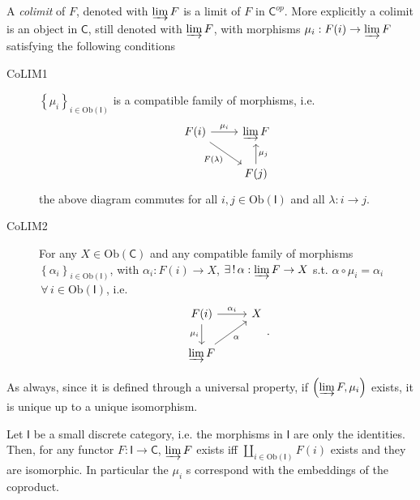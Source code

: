 \begin{defn}
	A {\em colimit} of $F$, denoted with $\varinjlim F$ is a limit of $F$ in $\mathsf{C}^{op}$.
	More explicitly a colimit is an object in $\mathsf{C}$, still denoted with $\varinjlim F$, 
	with morphisms $\mu_i: F(i) \to \varinjlim F$ satisfying the following conditions
	\begin{description}
		\item[CoLIM1] $\left\{ \mu_i \right\}_{i \in \mathrm{Ob} \left(\mathsf{I}\right)}$ is a compatible family of morphisms, i.e.
			\begin{equation}
			\begin{tikzcd}
				F(i) \arrow[r, "\mu_i", rightarrow] \arrow[rd, "F(\lambda)"', rightarrow] &
				\varinjlim F \\
				&
				F(j) \arrow[u, "\mu_j"', rightarrow] 
			\end{tikzcd}
			\end{equation} 
			the above diagram commutes for all $i, j \in \mathrm{Ob} \left(\mathsf{I}\right)$ and all $\lambda: i \to j$.
		\item[CoLIM2] For any $X \in \mathrm{Ob} \left(\mathsf{C}\right)$ and any compatible family of morphisms
			$\left\{ \alpha_i \right\}_{i \in \mathrm{Ob} \left(\mathsf{I}\right)}$, 
			with $\alpha_i: F(i) \to X$, 
			$\exists\, !\, \alpha: \varinjlim F \to X$ s.t. 
			$\alpha \circ \mu_i = \alpha_i$ $\,\forall\, i \in \mathrm{Ob} \left(\mathsf{I}\right)$, i.e.
			\begin{equation}
			\begin{tikzcd}
				F(i) \arrow[r, "\alpha_i", rightarrow] \arrow[d, "\mu_i"', rightarrow] &
				X\\
				\varinjlim F \arrow[ru, "\alpha"', rightarrow]  
			\end{tikzcd}
			.\end{equation} 
	\end{description} 
\end{defn}

\begin{rem}
	As always, since it is defined through a universal property, if $\left(\varinjlim F, \mu_i \right)$ exists,
	it is unique up to a unique isomorphism.
\end{rem}

\begin{ex}
	Let $\mathsf{I}$ be a small discrete category, i.e. the morphisms in $\mathsf{I}$ are only the identities.
	Then, for any functor $F: \mathsf{I} \to \mathsf{C}$, $\varinjlim F$ exists iff
	$\coprod_{i \in \mathrm{Ob} \left(\mathsf{I}\right)} F(i)$ exists and they are isomorphic.
	In particular the $\mu_i$ s correspond with the embeddings of the coproduct.
\end{ex} 

